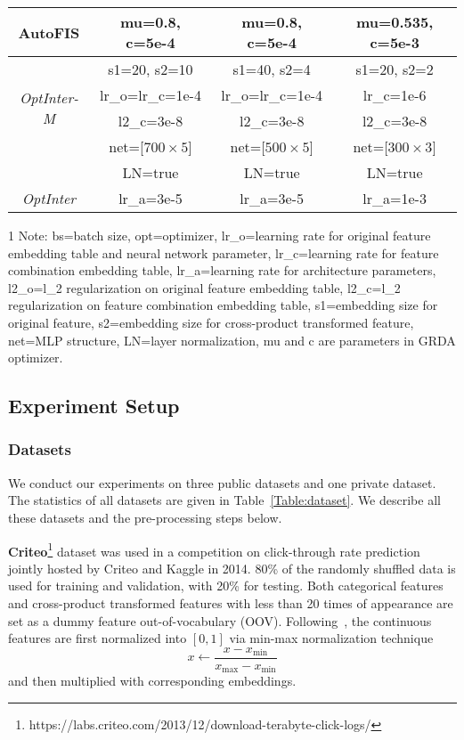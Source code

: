 \documentclass[conference]{IEEEtran}
\begin{document}
\begin{table}[!htbp]
\begin{tabular}{|c|c|c|c|}
		\hline
		    \multirow{1}{*}{AutoFIS}  & mu=0.8, c=5e-4 & mu=0.8, c=5e-4 & mu=0.535, c=5e-3 \\
		\hline
		    \multirow{4}{*}{\textit{OptInter-M}} & s1=20, s2=10 & s1=40, s2=4 & s1=20, s2=2 \\
		    \multirow{4}{*}{\textit{OptInter-F}} & lr\_o=lr\_c=1e-4 & lr\_o=lr\_c=1e-4 & lr\_c=1e-6 \\
		        & l2\_c=3e-8 & l2\_c=3e-8 & l2\_c=3e-8 \\
		        & net=[$700 \times 5$] & net=[$500 \times 5$] & net=[$300 \times 3$] \\
		        & LN=true & LN=true & LN=true \\
		    \textit{OptInter} & lr\_a=3e-5 & lr\_a=3e-5 & lr\_a=1e-3 \\
		\hline
	\end{tabular}
	\begin{tablenotes}
    \footnotesize
    \item[1] Note: bs=batch size, opt=optimizer, lr\_o=learning rate for original feature embedding table and neural network parameter, lr\_c=learning rate for feature combination embedding table, lr\_a=learning rate for architecture parameters,  l2\_o=l\_2 regularization on original feature embedding table, l2\_c=l\_2 regularization on feature combination embedding table, s1=embedding size for original feature, s2=embedding size for cross-product transformed feature, net=MLP structure, LN=layer normalization, mu and c are parameters in GRDA optimizer\cite{GRDA}.
    \end{tablenotes}
	\label{Table:param}
\end{table}

\subsection{Experiment Setup}
\subsubsection{Datasets}
We conduct our experiments on three public datasets and one private dataset. The statistics of all datasets are given in Table~\ref{Table:dataset}. We describe all these datasets and the pre-processing steps below.

\textbf{Criteo}\footnote{https://labs.criteo.com/2013/12/download-terabyte-click-logs/} dataset was used in a competition on click-through rate prediction jointly hosted by Criteo and Kaggle in 2014. 80\% of the randomly shuffled data is used for training and validation, with 20\% for testing. Both categorical features and cross-product transformed features with less than 20 times of appearance are set as a dummy feature out-of-vocabulary (OOV). Following~\cite{DeepFM}, the continuous features are first normalized into $[0,1]$ via min-max normalization technique
\begin{equation}
    x \gets \frac{x - x_{\min}}{x_{\max} - x_{\min}}
\end{equation}
and then multiplied with corresponding embeddings. 
\end{document}
